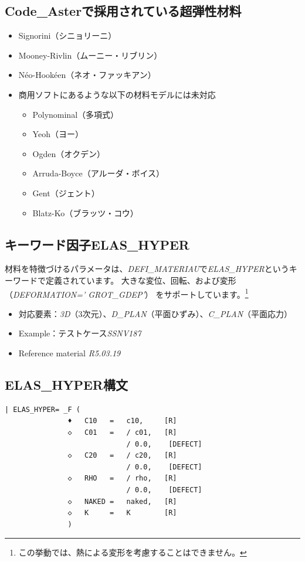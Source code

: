 \subsection{Code\_Asterで採用されている超弾性材料}
\begin{itemize}
	\item Signorini（シニョリーニ）
	\item Mooney-Rivlin（ムーニー・リブリン）
	\item Néo-Hookéen（ネオ・ファッキアン）
\end{itemize}
\begin{itemize}
	\item 商用ソフトにあるような以下の材料モデルには未対応
	      \begin{itemize}
		      \item Polynominal（多項式）
		      \item Yeoh（ヨー）
		      \item Ogden（オクデン）
		      \item Arruda-Boyce（アルーダ・ボイス）
		      \item Gent（ジェント）
		      \item Blatz-Ko（ブラッツ・コウ）
	      \end{itemize}
\end{itemize}
\clearpage
\subsection{キーワード因子ELAS\_HYPER}
材料を特徴づけるパラメータは、\textit{DEFI\_MATERIAU}で\textit{ELAS\_HYPER}というキーワードで定義されています。
\vspace{\baselineskip}
大きな変位、回転、および変形 （\textit{DEFORMATION=' GROT\_GDEP'}） をサポートしています。\footnote{この挙動では、熱による変形を考慮することはできません。}
\begin{itemize}
	\item 対応要素：\textit{3D}（3次元）、\textit{D\_PLAN}（平面ひずみ）、\textit{C\_PLAN}（平面応力）
	\item Example：テストケース\textit{SSNV187}
	\item Reference material \textit{R5.03.19}
\end{itemize}
\clearpage
\subsection{ELAS\_HYPER構文}
\begin{lstlisting}[caption =Syntax, label = Syntax]
| ELAS_HYPER= _F (
               ♦   C10   =   c10,     [R]
               ◇   C01   =   / c01,   [R]
                             / 0.0,    [DEFECT]
               ◇   C20   =   / c20,   [R]
                             / 0.0,    [DEFECT]
               ◇   RHO   =   / rho,   [R]
                             / 0.0,    [DEFECT]
               ◇   NAKED =   naked,   [R]
               ◇   K     =   K        [R]
               )
\end{lstlisting}
\clearpage
